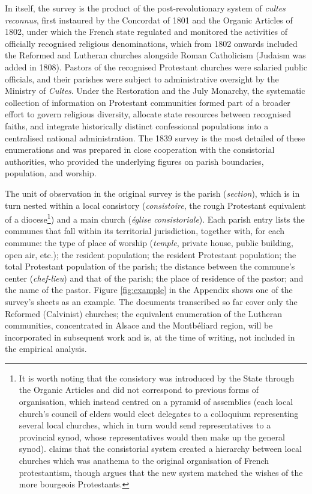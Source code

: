 \documentclass[12pt]{article}
\begin{document}
In itself, the survey is the product of the post-revolutionary system of \textit{cultes reconnus}, first instaured by the Concordat of 1801 and the Organic Articles of 1802, under which the French state regulated and monitored the activities of officially recognised religious denominations, which from 1802 onwards included the Reformed and Lutheran churches alongside Roman Catholicism (Judaism was added in 1808). Pastors of the recognised Protestant churches were salaried public officials, and their parishes were subject to administrative oversight by the Ministry of \textit{Cultes}. Under the Restoration and the July Monarchy, the systematic collection of information on Protestant communities formed part of a broader effort to govern religious diversity, allocate state resources between recognised faiths, and integrate historically distinct confessional populations into a centralised national administration. The 1839 survey is the most detailed of these enumerations and was prepared in close cooperation with the consistorial authorities, who provided the underlying figures on parish boundaries, population, and worship.

The unit of observation in the original survey is the parish (\textit{section}), which is in turn nested within a local consistory (\textit{consistoire}, the rough Protestant equivalent of a diocese\footnote{It is worth noting that the consistory was introduced by the State through the Organic Articles and did not correspond to previous forms of organisation, which instead centred on a pyramid of assemblies (each local church's council of elders would elect delegates to a colloquium representing several local churches, which in turn would send representatives to a provincial synod, whose representatives would then make up the general synod). \textcite{encreveProtestantsFrance18001985} claims that the consistorial system created a hierarchy between local churches which was anathema to the original organisation of French protestantism, though \textcite{schramProtestantismPoliticsFrance1954} argues that the new system matched the wishes of the more bourgeois Protestants.}) and a main church (\textit{église consistoriale}). Each parish entry lists the communes that fall within its territorial jurisdiction, together with, for each commune: the type of place of worship (\textit{temple}, private house, public building, open air, etc.); the resident population; the resident Protestant population; the total Protestant population of the parish; the distance between the commune's center (\textit{chef-lieu}) and that of the parish; the place of residence of the pastor; and the name of the pastor. Figure \ref{fig:example} in the Appendix shows one of the survey's sheets as an example. The documents transcribed so far cover only the Reformed (Calvinist) churches; the equivalent enumeration of the Lutheran communities, concentrated in Alsace and the Montbéliard region, will be incorporated in subsequent work and is, at the time of writing, not included in the empirical analysis.
\end{document}
